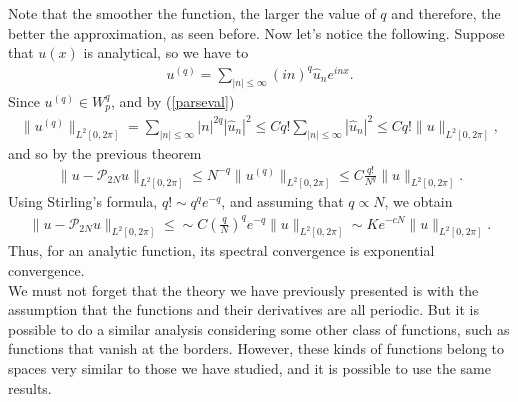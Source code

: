     \noindent Note that the smoother the function, the larger the value of $q$ and therefore, the better the approximation, as seen before. Now let's notice the following. Suppose that $u(x)$ is analytical, so we have to
    	\begin{align*}
    		 u^{(q)} = \displaystyle 
    		 \sum_{ |n| \leq \infty} (in)^q \hat{u}_{n}e^{inx}.
    	\end{align*}
    Since $u^{(q)} \in W^q_p$, and by (\ref{parseval})
        \begin{align*}
            \|u^{(q)}\|_{L^2 [0, 2\pi]} = \sum_{ |n| \leq \infty} |n|^{2q} |\hat{u}_{n}|^2 \leq C q! \sum_{ |n| \leq \infty} |\hat{u}_{n}|^2 \leq C q! \| u \|_{L^2 [0, 2\pi]},
        \end{align*}
    and so by the previous theorem
        \begin{align*}
            \|u - \mathcal{P}_{2N} u \|_{L^2 [0, 2\pi]} \leq  N^{-q} \|u^{(q)}\|_{L^2 [0, 2\pi]} \leq C \frac{q!}{N^{q}} \| u \|_{L^2 [0, 2\pi]}.
        \end{align*}
    Using Stirling’s formula, $q! \sim q^q e^{-q}$, and assuming that $q \propto N$, we obtain
        \begin{align*}
            \|u - \mathcal{P}_{2N} u \|_{L^2 [0, 2\pi]} \leq \sim C \left(\frac{q}{N}\right)^q e^{-q} \| u \|_{L^2 [0, 2\pi]} \sim K e^{-c N} \| u \|_{L^2 [0, 2\pi]}.
        \end{align*}
    Thus, for an analytic function, its spectral convergence is exponential convergence. \\
    
    We must not forget that the theory we have previously presented is with the assumption that the functions and their derivatives are all periodic. But it is possible to do a similar analysis considering some other class of functions, such as functions that vanish at the borders. However, these kinds of functions belong to spaces very similar to those we have studied, and it is possible to use the same results.